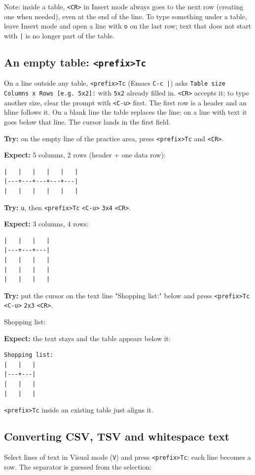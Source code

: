 Note: inside a table, \texttt{<CR>} in Insert mode always goes to the next row
(creating one when needed), even at the end of the line. To type something
under a table, leave Insert mode and open a line with \texttt{o} on the last row;
text that does not start with \texttt{|} is no longer part of the table.
\subsection{An empty table: \texttt{<prefix>Tc}}
\label{sec:org4f04a7e}
On a line outside any table, \texttt{<prefix>Tc} (Emacs \texttt{C-c |}) asks
\texttt{Table size Columns x Rows [e.g. 5x2]:} with \texttt{5x2} already filled in.
\texttt{<CR>} accepts it; to type another size, clear the prompt with \texttt{<C-u>} first.
The first row is a header and an hline follows it. On a blank line the
table replaces the line; on a line with text it goes below that line. The
cursor lands in the first field.

\textbf{Try:} on the empty line of the practice area, press \texttt{<prefix>Tc} and \texttt{<CR>}.

\textbf{Expect:} 5 columns, 2 rows (header + one data row):
\begin{verbatim}
|   |   |   |   |   |
|---+---+---+---+---|
|   |   |   |   |   |
\end{verbatim}

\textbf{Try:} \texttt{u}, then \texttt{<prefix>Tc} \texttt{<C-u>} \texttt{3x4} \texttt{<CR>}.

\textbf{Expect:} 3 columns, 4 rows:
\begin{verbatim}
|   |   |   |
|---+---+---|
|   |   |   |
|   |   |   |
|   |   |   |
\end{verbatim}

\textbf{Try:} put the cursor on the text line "Shopping list:" below and press
\texttt{<prefix>Tc} \texttt{<C-u>} \texttt{2x3} \texttt{<CR>}.

Shopping list:

\textbf{Expect:} the text stays and the table appears below it:
\begin{verbatim}
Shopping list:
|   |   |
|---+---|
|   |   |
|   |   |
\end{verbatim}

\texttt{<prefix>Tc} inside an existing table just aligns it.
\subsection{Converting CSV, TSV and whitespace text}
\label{sec:orge5cb850}
Select lines of text in Visual mode (\texttt{V}) and press \texttt{<prefix>Tc}: each line
becomes a row. The separator is guessed from the selection:

